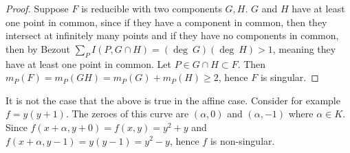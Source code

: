      \begin{proof}
         Suppose $F$ is reducible with two components $G,H$. $G$ and $H$ have at least one point in common, since if they have a component in common, then they intersect at infinitely many points and if they have no components in common, then by Bezout $\sum_P I(P,G\cap H)=(\deg\ G) (\deg \ H)>1$, meaning they have at least one point in common. Let $P\in G\cap H\subset F$. Then $m_P(F)=m_P(GH)=m_P(G)+m_P(H)\geq 2$, hence $F$ is singular.
     \end{proof}
     \begin{remark}
         It is not the case that the above is true in the affine case. Consider for example $f=y(y+1)$. The zeroes of this curve are $(\alpha,0)$ and $(\alpha,-1)$ where $\alpha\in K$. Since $f(x+\alpha,y+0)=f(x,y)=y^2+y$ and $f(x+\alpha,y-1)=y(y-1)=y^2-y$, hence $f$ is non-singular.
     \end{remark}
